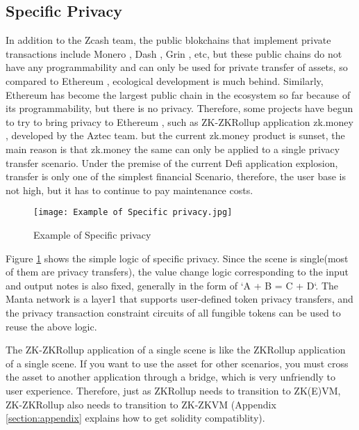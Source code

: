 \subsection{Specific Privacy}

In addition to the Zcash \cite{website:Zcash} team, the public blokchains that implement private transactions 
include Monero \cite{website:Monero}, Dash \cite{website:Dash}, Grin \cite{website:Grin}, etc, but these public chains do not have any 
programmability and can only be used for private transfer of assets, so compared to 
Ethereum \cite{website:Ethereum}, ecological development is much behind. Similarly, Ethereum \cite{website:Ethereum} has become 
the largest public chain in the ecosystem so far because of its programmability, 
but there is no privacy. Therefore, some projects have begun to try to bring privacy to 
Ethereum \cite{website:Ethereum}, such as ZK-ZKRollup application zk.money \cite{website:zk.money}, developed by the Aztec \cite{website:Aztec} team. 
but the current zk.money \cite{website:zk.money} product is sunset, the main reason is that zk.money \cite{website:zk.money}
the same can only be applied to a single privacy transfer scenario. Under the premise 
of the current Defi application explosion, transfer is only one of the simplest 
financial Scenario, therefore, the user base is not high, but it has to continue 
to pay maintenance costs.
\begin{figure}[!ht]
    \centering
    \texttt{[image: Example of Specific privacy.jpg]}
    \caption{Example of Specific privacy}
    \label{fig:Example of Specific privacy}
\end{figure}

Figure \ref{fig:Example of Specific privacy} shows the simple logic of specific privacy. Since the scene is single(most of 
them are privacy transfers), the value change logic corresponding to the input and output 
notes is also fixed, generally in the form of `A + B = C + D`. The Manta network \cite{website:Manta-network} is a 
layer1 that supports user-defined token privacy transfers, and the privacy transaction 
constraint circuits of all fungible tokens can be used to reuse the above logic.

The ZK-ZKRollup application of a single scene is like the ZKRollup application of a 
single scene. If you want to use the asset for 
other scenarios, you must cross the asset to another application through a bridge, 
which is very unfriendly to user experience. Therefore, just as ZKRollup needs to 
transition to ZK(E)VM, ZK-ZKRollup also needs to transition to ZK-ZKVM (Appendix \ref{section:appendix} explains 
how to get solidity compatiblity).